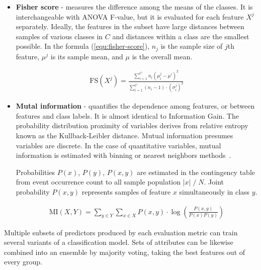 \begin{itemize}
\item \textbf{Fisher score} - measures the difference among the means of the classes. It is interchangeable with ANOVA F-value, but it is evaluated for each feature $X^j$ separately. Ideally, the features in the subset have large distances between samples of various classes in $C$ and distances within a class are the smallest possible. In the formula (\ref{equ:fisher-score}), $n_j$ is the sample size of $j$th feature, $\mu^j$ is its sample mean, and $\mu$ is the overall mean.

\begin{ceqn}\begin{align}
\mathrm{FS}(X^j) = \frac{\sum_{i=1}^{C} n_i(\mu_i^j - \mu^i)^2}{\sum_{i=1}^{C} (n_i - 1) \cdot (\sigma_i^j)^2}
\label{equ:fisher-score}
\end{align}\end{ceqn}

\item \textbf{Mutal information} - quantifies the dependence among features, or between features and class labels. It is almost identical to Information Gain. The probability distribution proximity of variables derives from relative entropy known as the Kullback-Leibler distance. Mutual information presumes variables are discrete. In the case of quantitative variables, mutual information is estimated with binning or nearest neighbors methods~\cite{ross_mutual_2014}.

Probabilities $P(x)$, $P(y)$, $P(x, y)$ are estimated in the contingency table from event occurrence count to all sample population $|x|\;/\;N$. Joint probability $P(x, y)$ represents samples of feature $x$ simultaneously in class $y$.

\begin{ceqn}\begin{align}
\mathrm{MI}(X, Y) = \sum_{y \in Y} \sum_{x \in X} P(x, y) \cdot \log\left(\frac{P(x, y)}{P(x)P(y)}\right)
\end{align}\end{ceqn}
\end{itemize}

Multiple subsets of predictors produced by each evaluation metric can train several variants of a classification model. Sets of attributes can be likewise combined into an ensemble by majority voting, taking the best features out of every group.